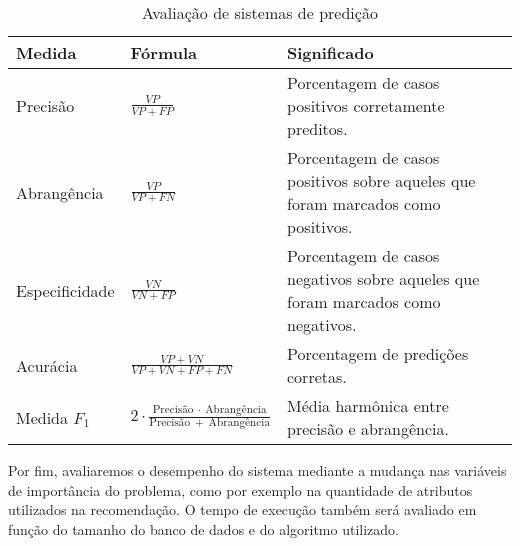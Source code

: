 \begin{table}[hp]
\begin{center}
    \caption{Avaliação de sistemas de predição}
    \label{tab:avaliacao-predicao}
    \begin{tabular}{  | >{\arraybackslash} m{3cm} | >{\centering\arraybackslash} m{4cm} | >{\arraybackslash} m{6cm} | }
    \hline
    \textbf{Medida} & \textbf{Fórmula} & \textbf{Significado} \\ \hline
    Precisão &  $\frac{VP}{VP+FP}$ & Porcentagem de casos positivos corretamente preditos. \\ \hline                            
    Abrangência & $\frac{VP}{VP+FN}$ & Porcentagem de casos positivos sobre aqueles que foram marcados como positivos. \\ \hline
    Especificidade & $\frac{VN}{VN+FP}$ &  Porcentagem de casos negativos sobre aqueles que foram marcados como negativos. \\ \hline
    Acurácia & $\frac{VP+VN}{VP+VN+FP+FN}$ & Porcentagem de predições corretas. \\ \hline
    Medida $F_1$ &  $2 \cdot \frac{\mathrm{Precisão}~\cdot~\mathrm{Abrangência}}{\mathrm{Precisão}~+~\mathrm{Abrangência}}$ & Média harmônica entre precisão e abrangência. \\ \hline
    \end{tabular}
\end{center}
\end{table}

Por fim, avaliaremos o desempenho do sistema mediante a mudança nas variáveis de importância do problema, como por exemplo na quantidade de atributos utilizados na recomendação. O tempo de execução também será avaliado em função do tamanho do banco de dados e do algoritmo utilizado.

